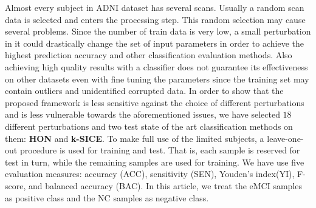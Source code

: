 \documentclass[journal]{IEEEtran}
\begin{document}
	Almost every subject in ADNI dataset has several scans. Usually a random scan data is selected and enters the processing step. This random selection may cause several problems. Since the number of train data is very low, a small perturbation in it could drastically change the set of input parameters in order to achieve the highest prediction accuracy and other classification evaluation methods. Also achieving high quality results with a classifier does not guarantee its effectiveness on other datasets even with fine tuning the parameters since the training set may contain outliers and unidentified corrupted data. 
	In order to show that the proposed framework is less sensitive against the choice of different perturbations and is less vulnerable towards the aforementioned issues, we have selected $18$ different perturbations and two test state of the art classification methods on them: \textbf{HON} and \textbf{k-SICE}.   
	To make full use of the limited subjects, a leave-one-out procedure is used for training and test. That is, each sample is reserved for test in turn, while the remaining samples are used for training.
	We have use five
	evaluation measures: accuracy (ACC), sensitivity (SEN), Youden’s index(YI), F-score, and balanced accuracy (BAC). 
	In this article, we treat the eMCI samples as positive class and the NC samples as negative class.
	
\end{document}
